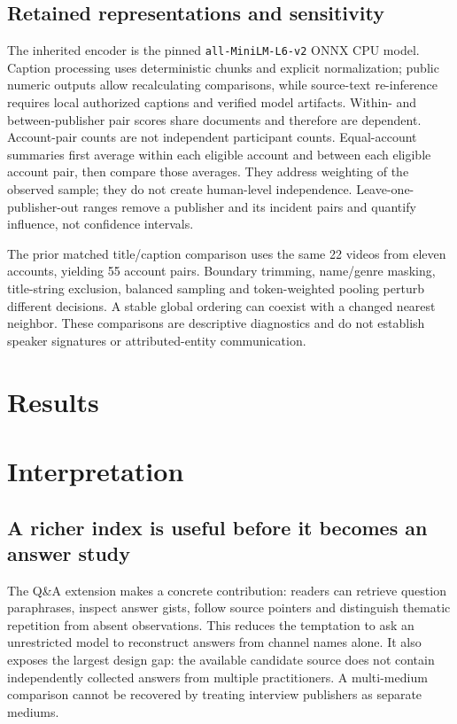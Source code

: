 \subsection{Retained representations and sensitivity}
The inherited encoder is the pinned \texttt{all-MiniLM-L6-v2} ONNX CPU model. Caption processing uses deterministic chunks and explicit normalization; public numeric outputs allow recalculating comparisons, while source-text re-inference requires local authorized captions and verified model artifacts. Within- and between-publisher pair scores share documents and therefore are dependent. Account-pair counts are not independent participant counts. Equal-account summaries first average within each eligible account and between each eligible account pair, then compare those averages. They address weighting of the observed sample; they do not create human-level independence. Leave-one-publisher-out ranges remove a publisher and its incident pairs and quantify influence, not confidence intervals.

The prior matched title/caption comparison uses the same 22 videos from eleven accounts, yielding 55 account pairs. Boundary trimming, name/genre masking, title-string exclusion, balanced sampling and token-weighted pooling perturb different decisions. A stable global ordering can coexist with a changed nearest neighbor. These comparisons are descriptive diagnostics and do not establish speaker signatures or attributed-entity communication.

\section{Results}


\section{Interpretation}
\subsection{A richer index is useful before it becomes an answer study}
The Q\&A extension makes a concrete contribution: readers can retrieve question paraphrases, inspect answer gists, follow source pointers and distinguish thematic repetition from absent observations. This reduces the temptation to ask an unrestricted model to reconstruct answers from channel names alone. It also exposes the largest design gap: the available candidate source does not contain independently collected answers from multiple practitioners. A multi-medium comparison cannot be recovered by treating interview publishers as separate mediums.

